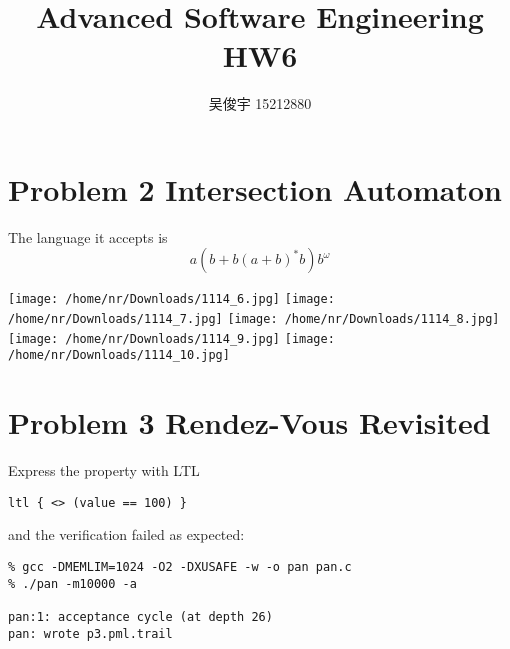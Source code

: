 \documentclass{ctexart}
\title{Advanced Software Engineering HW6}
\author{吴俊宇 15212880}
\begin{document}
\maketitle

%
%
%
%
%
%

\section*{Problem 2 Intersection Automaton}

The language it accepts is
$$
a (b + b (a + b)^* b) b^\omega
$$

\texttt{[image: /home/nr/Downloads/1114\_6.jpg]}
\texttt{[image: /home/nr/Downloads/1114\_7.jpg]}
\texttt{[image: /home/nr/Downloads/1114\_8.jpg]}
\texttt{[image: /home/nr/Downloads/1114\_9.jpg]}
\texttt{[image: /home/nr/Downloads/1114\_10.jpg]}

\section*{Problem 3 Rendez-Vous Revisited}

Express the property with LTL
\begin{lstlisting}[frame=single]
ltl { <> (value == 100) }
\end{lstlisting}

and the verification failed as expected:
\begin{lstlisting}[frame=single]
% spin -a $<
% gcc -DMEMLIM=1024 -O2 -DXUSAFE -w -o pan pan.c
% ./pan -m10000 -a

pan:1: acceptance cycle (at depth 26)
pan: wrote p3.pml.trail
\end{lstlisting}
\end{document}
